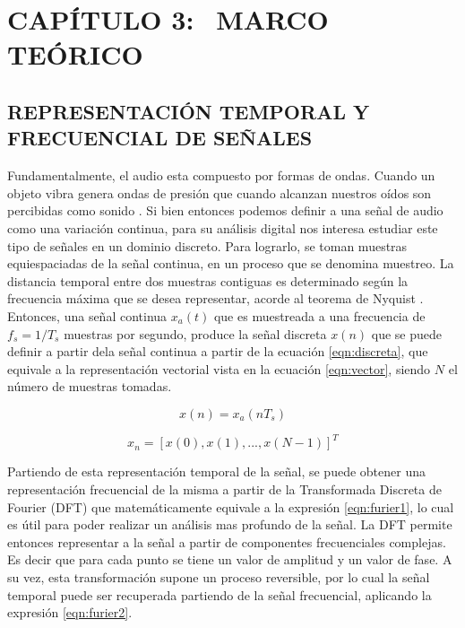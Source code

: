\section[Marco Teórico]{CAPÍTULO 3:$\ \ \ \ $MARCO TEÓRICO} 

\subsection[Representación temporal y frecuencial de señales]{REPRESENTACIÓN TEMPORAL Y FRECUENCIAL DE SEÑALES}
Fundamentalmente, el audio esta compuesto por formas de ondas. Cuando un objeto vibra genera ondas de presión que cuando alcanzan nuestros oídos son percibidas como sonido \cite{ritmo}. Si bien entonces podemos definir a una señal de audio como una variación continua, para su análisis digital nos interesa estudiar este tipo de señales en un dominio discreto. Para lograrlo, se toman muestras equiespaciadas de la señal continua, en un proceso que se denomina muestreo. La distancia temporal entre dos muestras contiguas es determinado según la frecuencia máxima que se desea representar, acorde al teorema de Nyquist \cite{openheim}. Entonces, una señal continua $x_{a}(t)$ que es muestreada a una frecuencia de $f_{s} = 1 / T_{s}$ muestras por segundo, produce la señal discreta $x(n)$ que se puede definir a partir dela señal continua a partir de la ecuación \ref{eqn:discreta}, que equivale a la representación vectorial vista en la ecuación   \ref{eqn:vector}, siendo $N$ el número de muestras tomadas. 

\begin{equation}
\label{eqn:discreta}
	x(n) = x_{a}(nT_{s})
\end{equation} 

\begin{equation}
\label{eqn:vector}
	x_{n} = [x(0), x(1),..., x(N-1) ]^{T}
\end{equation} 


Partiendo de esta representación temporal de la señal, se puede obtener una representación frecuencial de la misma a partir de la Transformada Discreta de Fourier (DFT) \cite{openheim} que matemáticamente equivale a la expresión \ref{eqn:furier1}, lo cual es útil para poder realizar un análisis mas profundo de la señal. La DFT permite entonces representar a la señal a partir de componentes frecuenciales complejas. Es decir que para cada punto se tiene un valor de amplitud y un valor de fase. A su vez, esta transformación supone un proceso reversible, por lo cual la señal temporal puede ser recuperada partiendo de la señal frecuencial, aplicando la expresión \ref{eqn:furier2}. 

